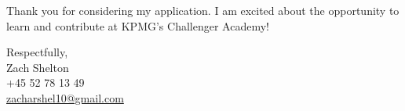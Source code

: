 \documentclass[11pt,a4]{article}
\begin{document}
Thank you for considering my application. I am excited about the opportunity to learn and contribute at KPMG's Challenger Academy!

\vspace{0.5cm}
\raggedright
Respectfully, \\ Zach Shelton 
\\ 
+45 52 78 13 49 \\ 
\href{mailto:zacharshel10@gmail.com}{zacharshel10@gmail.com} 
\end{document}
